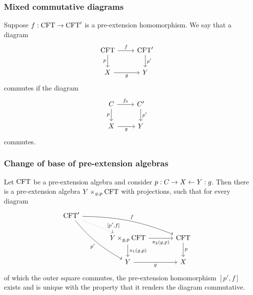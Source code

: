 \documentclass[handout]{beamer}
\newcommand\important[1]{\textbf{\color{red!90!black}#1}}
\begin{document}
\begin{frame}
\frametitle{\bf Mixed commutative diagrams}
Suppose $f:\mathrm{CFT}\to\mathrm{CFT}'$ is a pre-extension homomorphism. We say that
a diagram
\begin{equation*}
\begin{tikzcd}[ampersand replacement=\&]
\stesys
  \ar{r}{f}
  \ar{d}[swap]{p}
  \&
\stesys'
  \ar{d}{p'}
  \\
X \ar{r}[swap]{g}
  \&
Y
\end{tikzcd}
\end{equation*}
commutes if the diagram
\begin{equation*}
\begin{tikzcd}[ampersand replacement=\&]
\stesysc
  \ar{r}{f_0}
  \ar{d}[swap]{p}
  \&
\stesysc'
  \ar{d}{p'}
  \\
X \ar{r}[swap]{g}
  \&
Y
\end{tikzcd}
\end{equation*}
commutes.
\end{frame}

\begin{frame}
\frametitle{\bf Change of base of pre-extension algebras}
Let $\mathrm{CFT}$ be a pre-extension algebra and consider $p:C\rightarrow X\leftarrow Y:g$.
Then there is a pre-extension algebra \important{$\cobesys{Y}{\stesys}{g}{p}$} with projections, such that for every diagram
\begin{equation*}
\begin{tikzcd}[ampersand replacement=\&,column sep=large]
\stesys'
  \ar[bend right=10]{ddr}[swap]{p'}
  \ar[bend left=10]{rrd}{f}
  \ar[dotted]{dr}[near end]{[p',f]}
  \\
  {}\&
\cobesys{Y}{\stesys}{g}{p}
  \ar{d}{\pullbackpr{1}{g}{p}}
  \ar{r}[swap]{\pullbackpr{2}{g}{p}}
  \&
\stesys
  \ar{d}{p}
  \\
  {}\&
Y \ar{r}[swap]{g}
  \&
X
\end{tikzcd}
\end{equation*}
of which the outer square commutes, the pre-extension homomorphism \important{$[p',f]$} exists
and is unique with the property that it renders the diagram commutative.
\end{frame}
\end{document}
